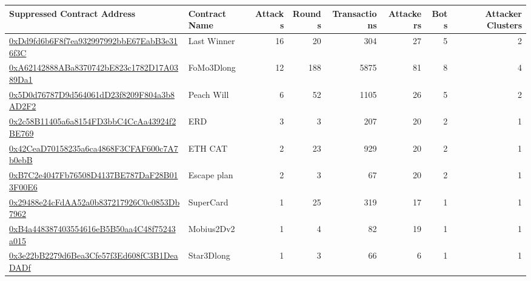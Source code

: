 \begin{tabular}{llrrrrrr}
\toprule
                                                                                                Suppressed Contract Address & Contract Name & Attacks & Rounds & Transactions &  Attackers &  Bots & Attacker Clusters \\
\midrule
 \href{https://etherscan.io/address/0xDd9fd6b6F8f7ea932997992bbE67EabB3e316f3C}{0xDd9fd6b6F8f7ea932997992bbE67EabB3e316f3C} &   Last Winner &      16 &     20 &          304 &         27 &     5 &                 2 \\
 \href{https://etherscan.io/address/0xA62142888ABa8370742bE823c1782D17A0389Da1}{0xA62142888ABa8370742bE823c1782D17A0389Da1} &    FoMo3Dlong &      12 &    188 &         5875 &         81 &     8 &                 4 \\
 \href{https://etherscan.io/address/0x5D0d76787D9d564061dD23f8209F804a3b8AD2F2}{0x5D0d76787D9d564061dD23f8209F804a3b8AD2F2} &    Peach Will &       6 &     52 &         1105 &         26 &     5 &                 2 \\
 \href{https://etherscan.io/address/0x2c58B11405a6a8154FD3bbC4CcAa43924f2BE769}{0x2c58B11405a6a8154FD3bbC4CcAa43924f2BE769} &           ERD &       3 &      3 &          207 &         20 &     2 &                 1 \\
 \href{https://etherscan.io/address/0x42CeaD70158235a6ca4868F3CFAF600c7A7b0ebB}{0x42CeaD70158235a6ca4868F3CFAF600c7A7b0ebB} &       ETH CAT &       2 &     23 &          929 &         20 &     2 &                 1 \\
 \href{https://etherscan.io/address/0xB7C2e4047Fb76508D4137BE787DaF28B013F00E6}{0xB7C2e4047Fb76508D4137BE787DaF28B013F00E6} &   Escape plan &       2 &      3 &           67 &         20 &     2 &                 1 \\
 \href{https://etherscan.io/address/0x29488e24cFdAA52a0b837217926C0c0853Db7962}{0x29488e24cFdAA52a0b837217926C0c0853Db7962} &     SuperCard &       1 &     25 &          319 &         17 &     1 &                 1 \\
 \href{https://etherscan.io/address/0xB4a448387403554616eB5B50aa4C48f75243a015}{0xB4a448387403554616eB5B50aa4C48f75243a015} &    Mobius2Dv2 &       1 &      4 &           82 &         19 &     1 &                 1 \\
 \href{https://etherscan.io/address/0x3e22bB2279d6Bea3Cfe57f3Ed608fC3B1DeaDADf}{0x3e22bB2279d6Bea3Cfe57f3Ed608fC3B1DeaDADf} &    Star3Dlong &       1 &      3 &           66 &          6 &     1 &                 1 \\

\end{tabular}
